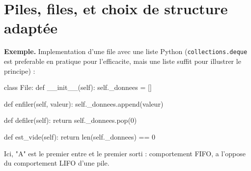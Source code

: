 \section{Piles, files, et choix de structure adaptée}



\textbf{Exemple.} Implementation d'une file avec une liste Python (\lstinline{collections.deque} est preferable en pratique pour l'efficacite, mais une liste suffit pour illustrer le principe) :
\begin{python}
class File:
    def __init__(self):
        self._donnees = []

    def enfiler(self, valeur):
        self._donnees.append(valeur)

    def defiler(self):
        return self._donnees.pop(0)

    def est_vide(self):
        return len(self._donnees) == 0
\end{python}

%

Ici, "A" est le premier entre et le premier sorti : comportement FIFO, a l'oppose du comportement LIFO d'une pile.

